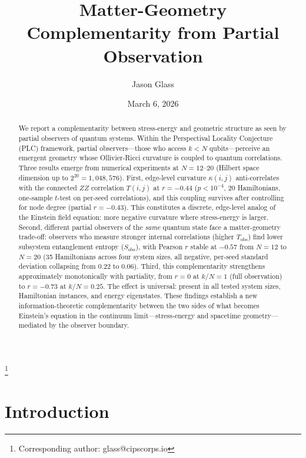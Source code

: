 \documentclass[aps,pra,twocolumn,superscriptaddress,floatfix]{revtex4-2}
\begin{document}
\title{Matter-Geometry Complementarity from Partial Observation}

\author{Jason Glass}
\thanks{Corresponding author: glass@cipscorps.io}

\date{March 6, 2026}

\begin{abstract}
We report a complementarity between stress-energy and geometric
structure as seen by partial observers of quantum systems.
Within the Perspectival Locality Conjecture (PLC) framework,
partial observers---those who access $k < N$ qubits---perceive
an emergent geometry whose Ollivier-Ricci curvature is
coupled to quantum correlations.
Three results emerge from numerical experiments at $N = 12$--$20$
(Hilbert space dimension up to $2^{20} = 1{,}048{,}576$).
First, edge-level curvature $\kappa(i,j)$ anti-correlates with
the connected $ZZ$ correlation $T(i,j)$ at $r = -0.44$
($p < 10^{-4}$, 20 Hamiltonians, one-sample $t$-test on
per-seed correlations), and this coupling survives
after controlling for node degree (partial $r = -0.43$).
This constitutes a discrete, edge-level analog of the
Einstein field equation: more negative curvature where
stress-energy is larger.
Second, different partial observers of the \emph{same} quantum
state face a matter-geometry trade-off: observers who
measure stronger internal correlations (higher $T_\mathrm{obs}$)
find lower subsystem entanglement entropy ($S_\mathrm{obs}$),
with Pearson $r$ stable at $-0.57$ from $N=12$ to $N=20$
(35 Hamiltonians across four system sizes, all negative,
per-seed standard deviation collapsing from $0.22$ to $0.06$).
Third, this complementarity strengthens approximately
monotonically with partiality, from $r = 0$ at $k/N = 1$ (full observation)
to $r = -0.73$ at $k/N = 0.25$.
The effect is universal: present in all tested system sizes,
Hamiltonian instances, and energy eigenstates.
These findings establish a new information-theoretic
complementarity between the two sides of what becomes
Einstein's equation in the continuum limit---stress-energy
and spacetime geometry---mediated by the observer boundary.
\end{abstract}

\maketitle

\section{Introduction}
\end{document}
